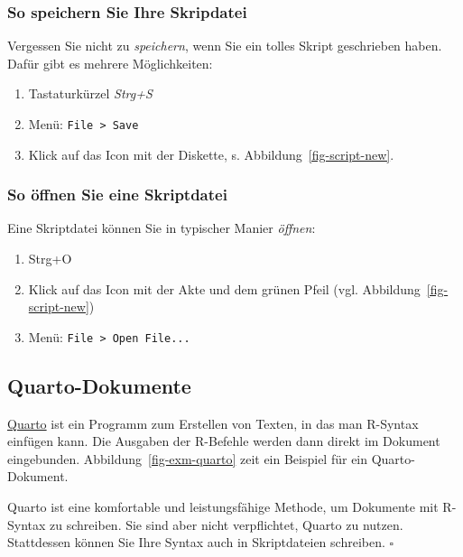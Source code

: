 \documentclass[
  a4paper,
  DIV=11]{scrreprt}
\providecommand{\tightlist}{%
  \setlength{\itemsep}{0pt}\setlength{\parskip}{0pt}}\usepackage{longtable,booktabs,array}
\theoremstyle{definition}
\theoremstyle{definition}
\theoremstyle{definition}
\theoremstyle{remark}
\begin{document}
\subsubsection{So speichern Sie Ihre
Skripdatei}\label{so-speichern-sie-ihre-skripdatei}

Vergessen Sie nicht zu \emph{speichern}, wenn Sie ein tolles Skript
geschrieben haben. Dafür gibt es mehrere Möglichkeiten:

\begin{enumerate}
\def\labelenumi{\arabic{enumi}.}
\tightlist
\item
  Tastaturkürzel \emph{Strg+S}
\item
  Menü: \texttt{File\ \textgreater{}\ Save}
\item
  Klick auf das Icon mit der Diskette, s.
  Abbildung~\ref{fig-script-new}.
\end{enumerate}

\subsubsection{So öffnen Sie eine
Skriptdatei}\label{so-uxf6ffnen-sie-eine-skriptdatei}

Eine Skriptdatei können Sie in typischer Manier \emph{öffnen}:

\begin{enumerate}
\def\labelenumi{\arabic{enumi}.}
\tightlist
\item
  Strg+O
\item
  Klick auf das Icon mit der Akte und dem grünen Pfeil (vgl.
  Abbildung~\ref{fig-script-new})
\item
  Menü: \texttt{File\ \textgreater{}\ Open\ File...}
\end{enumerate}

\subsection{Quarto-Dokumente}\label{quarto-dokumente}

\href{https://quarto.org/}{Quarto} ist ein Programm zum Erstellen von
Texten, in das man R-Syntax einfügen kann. Die Ausgaben der R-Befehle
werden dann direkt im Dokument eingebunden.
Abbildung~\ref{fig-exm-quarto} zeit ein Beispiel für ein
Quarto-Dokument.

\begin{tcolorbox}[enhanced jigsaw, leftrule=.75mm, opacitybacktitle=0.6, colback=white, colframe=quarto-callout-note-color-frame, coltitle=black, colbacktitle=quarto-callout-note-color!10!white, opacityback=0, left=2mm, breakable, titlerule=0mm, toptitle=1mm, bottomtitle=1mm, rightrule=.15mm, title=\textcolor{quarto-callout-note-color}{\faInfo}\hspace{0.5em}{Hinweis}, arc=.35mm, bottomrule=.15mm, toprule=.15mm]

Quarto ist eine komfortable und leistungsfähige Methode, um Dokumente
mit R-Syntax zu schreiben. Sie sind aber nicht verpflichtet, Quarto zu
nutzen. Stattdessen können Sie Ihre Syntax auch in Skriptdateien
schreiben. \(\square\)

\end{tcolorbox}
\end{document}

